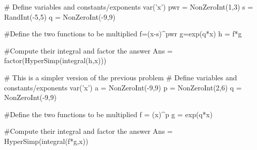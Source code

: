 







\begin{sagesilent}
# Define variables and constants/exponents
var('x')
pwr = NonZeroInt(1,3)
s = RandInt(-5,5)
q = NonZeroInt(-9,9)

#Define the two functions to be multiplied
f=(x-s)^pwr
g=exp(q*x)
h = f*g

#Compute their integral and factor the answer
Ans = factor(HyperSimp(integral(h,x)))
\end{sagesilent}



\begin{sagesilent}
# This is a simpler version of the previous problem
# Define variables and constants/exponents
var('x')
a = NonZeroInt(-9,9)
p = NonZeroInt(2,6)
q = NonZeroInt(-9,9)

#Define the two functions to be multiplied
f = (x)^p
g = exp(q*x)

#Compute their integral and factor the answer
Ans = HyperSimp(integral(f*g,x))

\end{sagesilent}



